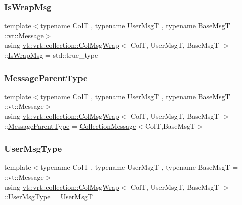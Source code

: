\subsubsection{\texorpdfstring{Is\+Wrap\+Msg}{IsWrapMsg}}
{\footnotesize\ttfamily template$<$typename ColT , typename User\+MsgT , typename Base\+MsgT  = \+::vt\+::\+Message$>$ \\
using \hyperlink{structvt_1_1vrt_1_1collection_1_1_col_msg_wrap}{vt\+::vrt\+::collection\+::\+Col\+Msg\+Wrap}$<$ ColT, User\+MsgT, Base\+MsgT $>$\+::\hyperlink{structvt_1_1vrt_1_1collection_1_1_col_msg_wrap_a788f0bead8cf9d8b5ed565b54d3c706a}{Is\+Wrap\+Msg} =  std\+::true\+\_\+type}

\mbox{\label{structvt_1_1vrt_1_1collection_1_1_col_msg_wrap_a51803f5a5355ade7dc2d1a46753ab4e9}} 
\subsubsection{\texorpdfstring{Message\+Parent\+Type}{MessageParentType}}
{\footnotesize\ttfamily template$<$typename ColT , typename User\+MsgT , typename Base\+MsgT  = \+::vt\+::\+Message$>$ \\
using \hyperlink{structvt_1_1vrt_1_1collection_1_1_col_msg_wrap}{vt\+::vrt\+::collection\+::\+Col\+Msg\+Wrap}$<$ ColT, User\+MsgT, Base\+MsgT $>$\+::\hyperlink{structvt_1_1location_1_1_entity_msg_a186637100a628eb04cb00127f5579210}{Message\+Parent\+Type} =  \hyperlink{structvt_1_1vrt_1_1collection_1_1_collection_message}{Collection\+Message}$<$ColT,Base\+MsgT$>$}

\mbox{\label{structvt_1_1vrt_1_1collection_1_1_col_msg_wrap_a168446c6b2feea3a003dbfa02f21e227}} 
\subsubsection{\texorpdfstring{User\+Msg\+Type}{UserMsgType}}
{\footnotesize\ttfamily template$<$typename ColT , typename User\+MsgT , typename Base\+MsgT  = \+::vt\+::\+Message$>$ \\
using \hyperlink{structvt_1_1vrt_1_1collection_1_1_col_msg_wrap}{vt\+::vrt\+::collection\+::\+Col\+Msg\+Wrap}$<$ ColT, User\+MsgT, Base\+MsgT $>$\+::\hyperlink{structvt_1_1vrt_1_1collection_1_1_collection_message_ace5b4eaa94f5b209ae321edd6c0b6c19}{User\+Msg\+Type} =  User\+MsgT}



